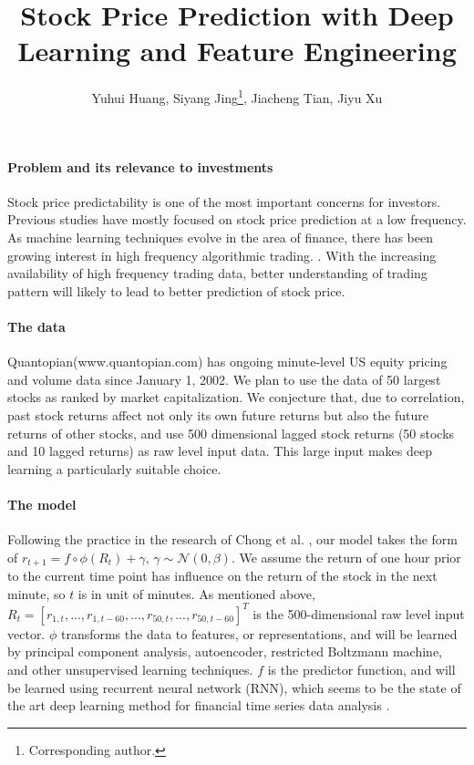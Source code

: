 \documentclass{article}
\title{Stock Price Prediction with Deep Learning and Feature Engineering}
\author{Yuhui Huang, Siyang Jing\thanks{Corresponding author.}, Jiacheng Tian, Jiyu Xu}
\begin{document}
\maketitle
\paragraph{Problem and its relevance to investments}
Stock price predictability is one of the most important concerns for investors. Previous studies have mostly focused on stock price prediction at a low frequency. As machine learning techniques evolve in the area of finance, there has been growing interest in high frequency algorithmic trading. \cite{Kearns2013}. With the increasing availability of high frequency trading data, better understanding of trading pattern will likely to lead to better prediction of stock price.

\paragraph{The data}
Quantopian(www.quantopian.com) has ongoing minute-level US equity pricing and volume data since January 1, 2002. We plan to use the data of 50 largest stocks as ranked by market capitalization. We conjecture that, due to correlation, past stock returns affect not only its own future returns but also the future returns of other stocks, and use 500 dimensional lagged stock returns (50 stocks and 10 lagged returns) as raw level input data. This large input makes deep learning a particularly suitable choice.

\paragraph{The model}
Following the practice in the research of Chong et al. \cite{Chong2017}, our model takes the form of
$r_{t+1}=f\circ\phi(R_t)+\gamma,\,\gamma\sim\mathcal{N}(0,\beta)$.
We assume the return of one hour prior to the current time point has influence on the return of the stock in the next minute, so $t$ is in unit of minutes. As mentioned above, $R_t = [r_{1,t},...,r_{1,t-60},...,r_{50,t},...,r_{50,t-60}]^T$ is the 500-dimensional raw level input vector. $\phi$ transforms the data to features, or representations, and will be learned by principal component analysis, autoencoder, restricted Boltzmann machine, and other unsupervised learning techniques. $f$ is the predictor function, and will be learned using recurrent neural network (RNN), which seems to be the state of the art deep learning method for financial time series data analysis \cite{Abe2018}.
\end{document}
